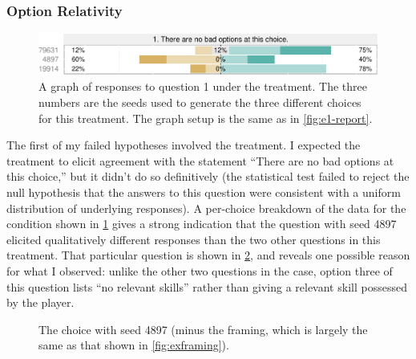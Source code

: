 \subsubsection{Option Relativity}


\begin{figure}[!h]
  \includegraphics[width=\textwidth]{fig/relaxed-q1.pdf}
  \caption[``No bad options'' prospective responses]{A graph of responses to question 1 under the \rlx{} treatment. The three numbers are the seeds used to generate the three different choices for this treatment. The graph setup is the same as in \cref{fig:e1-report}.}
  \label{fig:e1-relaxedq1}
\end{figure}


The first of my failed hypotheses involved the \rlx{} treatment.
%
I expected the \rlx{} treatment to elicit agreement with the statement ``There are no bad options at this choice,'' but it didn't do so definitively (the statistical test failed to reject the null hypothesis that the answers to this question were consistent with a uniform distribution of underlying responses).
%
A per-choice breakdown of the data for the \rlx{} condition shown in \cref{fig:e1-relaxedq1} gives a strong indication that the question with seed 4897 elicited qualitatively different responses than the two other questions in this treatment.
%
That particular question is shown in \cref{fig:e1-seed-4897}, and reveals one possible reason for what I observed: unlike the other two questions in the \rlx{} case, option three of this question lists ``no relevant skills'' rather than giving a relevant skill possessed by the player.


\begin{figure}[!h]
\centering
{}
\caption[``Relaxed'' choice 4897]{The \rlx{} choice with seed 4897 (minus the framing, which is largely the same as that shown in \cref{fig:exframing}).}
  \label{fig:e1-seed-4897}
\end{figure}


